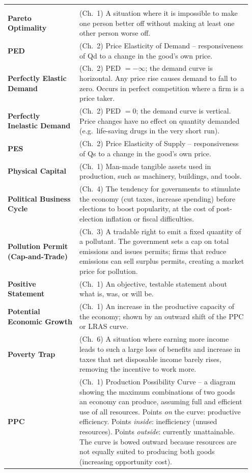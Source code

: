 \documentclass[11pt, a4paper, twoside]{book}
\begin{document}
\begin{longtable}{@{}>{\RaggedRight\arraybackslash}p{0.28\linewidth}>{\RaggedRight\arraybackslash}p{0.67\linewidth}@{}}
\multicolumn{2}{@{}l}{\textbf{\Large\color{CurveNavy} P}} \\[2pt]
\textbf{Pareto Optimality} & (Ch.~1) A situation where it is impossible to make one person better off without making at least one other person worse off. \\
\textbf{PED} & (Ch.~2) Price Elasticity of Demand -- responsiveness of Qd to a change in the good's own price. \\
\textbf{Perfectly Elastic Demand} & (Ch.~2) PED $= -\infty$; the demand curve is horizontal. Any price rise causes demand to fall to zero. Occurs in perfect competition where a firm is a price taker. \\
\textbf{Perfectly Inelastic Demand} & (Ch.~2) PED $= 0$; the demand curve is vertical. Price changes have no effect on quantity demanded (e.g.\ life-saving drugs in the very short run). \\
\textbf{PES} & (Ch.~2) Price Elasticity of Supply -- responsiveness of Qs to a change in the good's own price. \\
\textbf{Physical Capital} & (Ch.~1) Man-made tangible assets used in production, such as machinery, buildings, and tools. \\
\textbf{Political Business Cycle} & (Ch.~4) The tendency for governments to stimulate the economy (cut taxes, increase spending) before elections to boost popularity, at the cost of post-election inflation or fiscal difficulties. \\
\textbf{Pollution Permit (Cap-and-Trade)} & (Ch.~3) A tradable right to emit a fixed quantity of a pollutant. The government sets a cap on total emissions and issues permits; firms that reduce emissions can sell surplus permits, creating a market price for pollution. \\
\textbf{Positive Statement} & (Ch.~1) An objective, testable statement about what is, was, or will be. \\
\textbf{Potential Economic Growth} & (Ch.~1) An increase in the productive capacity of the economy; shown by an outward shift of the PPC or LRAS curve. \\
\textbf{Poverty Trap} & (Ch.~6) A situation where earning more income leads to such a large loss of benefits and increase in taxes that net disposable income barely rises, removing the incentive to work more. \\
\textbf{PPC} & (Ch.~1) Production Possibility Curve -- a diagram showing the maximum combinations of two goods an economy can produce, assuming full and efficient use of all resources. Points \textit{on} the curve: productive efficiency. Points \textit{inside}: inefficiency (unused resources). Points \textit{outside}: currently unattainable. The curve is bowed outward because resources are not equally suited to producing both goods (increasing opportunity cost). \\

\end{longtable}
\end{document}
